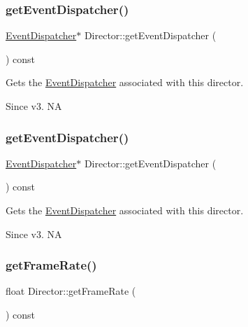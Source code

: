 \subsubsection{\texorpdfstring{get\+Event\+Dispatcher()}{getEventDispatcher()}\hspace{0.1cm}{\footnotesize\ttfamily [1/2]}}
{\footnotesize\ttfamily \hyperlink{classEventDispatcher}{Event\+Dispatcher}$\ast$ Director\+::get\+Event\+Dispatcher (\begin{DoxyParamCaption}{ }\end{DoxyParamCaption}) const\hspace{0.3cm}{\ttfamily [inline]}}

Gets the \hyperlink{classEventDispatcher}{Event\+Dispatcher} associated with this director. \begin{DoxySince}{Since}
v3.  NA 
\end{DoxySince}
\mbox{\label{classDirector_ae5984b5ba756d210fa4ec79578d17ca8}} 
\subsubsection{\texorpdfstring{get\+Event\+Dispatcher()}{getEventDispatcher()}\hspace{0.1cm}{\footnotesize\ttfamily [2/2]}}
{\footnotesize\ttfamily \hyperlink{classEventDispatcher}{Event\+Dispatcher}$\ast$ Director\+::get\+Event\+Dispatcher (\begin{DoxyParamCaption}{ }\end{DoxyParamCaption}) const\hspace{0.3cm}{\ttfamily [inline]}}

Gets the \hyperlink{classEventDispatcher}{Event\+Dispatcher} associated with this director. \begin{DoxySince}{Since}
v3.  NA 
\end{DoxySince}
\mbox{\label{classDirector_adb86cf6aa40949fd1d43ef8f837062e8}} 
\subsubsection{\texorpdfstring{get\+Frame\+Rate()}{getFrameRate()}\hspace{0.1cm}{\footnotesize\ttfamily [1/2]}}
{\footnotesize\ttfamily float Director\+::get\+Frame\+Rate (\begin{DoxyParamCaption}{ }\end{DoxyParamCaption}) const\hspace{0.3cm}{\ttfamily [inline]}}

